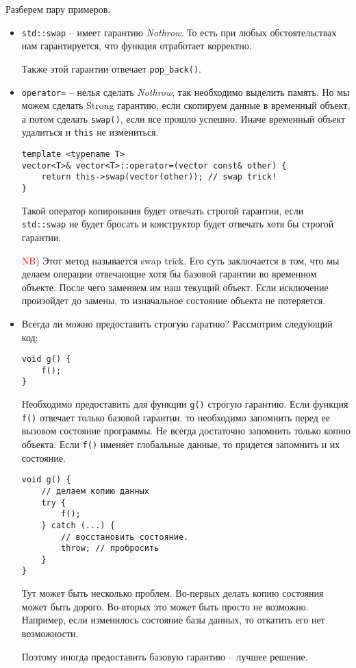 Разберем пару примеров.
\begin{itemize}
\item \texttt{std::swap} -- имеет гарантию \textit{Nothrow}. То есть при любых обстоятельствах нам гарантируется, что функция отработает корректно.

Также этой гарантии отвечает \texttt{pop_back()}.

\item \texttt{operator=} -- нелья сделать \textit{Nothrow}, так необходимо выделить память. Но мы можем сделать Strong гарантию, если скопируем данные в временный объект, а потом сделать \texttt{swap()}, если все прошло успешно. Иначе временный объект удалиться и \texttt{this} не измениться.
\begin{verbatim}
template <typename T>
vector<T>& vector<T>::operator=(vector const& other) {
    return this->swap(vector(other)); // swap trick!
}
\end{verbatim}
Такой оператор копирования будет отвечать строгой гарантии, если \texttt{std::swap} не будет бросать и конструктор будет отвечать хотя бы строгой гарантии.

\textcolor{red}{NB}) Этот метод называется swap trick. Его суть заключается в том, что мы делаем операции отвечающие хотя бы базовой гарантии во временном объекте. После чего заменяем им наш текущий объект. Если исключение произойдет до замены, то изначальное состояние объекта не потеряется.

\item
Всегда ли можно предоставить строгую гаратию?
Рассмотрим следующий код:
\begin{verbatim}
void g() {
    f();
}
\end{verbatim}
Необходимо предоставить для функции \texttt{g()} строгую гарантию. Если функция \texttt{f()} отвечает только базовой гарантии, то необходимо запомнить перед ее вызовом состояние программы. Не всегда достаточно запомнить только копию объекта. Если \texttt{f()} именяет глобальные данные, то придется запомнить и их состояние.
\begin{verbatim}
void g() {
    // делаем копию данных
    try {
        f();
    } catch (...) {
        // восстановить состояние.
        throw; // пробросить
    }
}
\end{verbatim}
Тут может быть несколько проблем. Во-первых делать копию состояния может быть дорого. Во-вторых это может быть просто не возможно. Например, если изменилось состояние базы данных, то откатить его нет возможности.

Поэтому иногда предоставить базовую гарантию -- лучшее решение.
\end{itemize}

